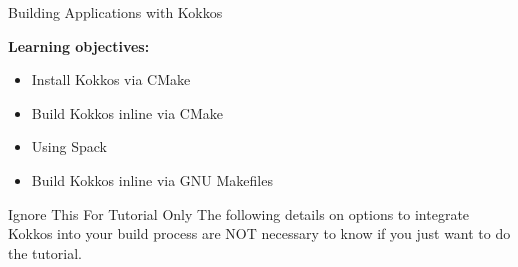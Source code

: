 



\begin{frame}[fragile]


  \vspace{10pt}
  {\Huge Building Applications with Kokkos}

  \vspace{10pt}

  \textbf{Learning objectives:}
  \begin{itemize}
    \item{Install Kokkos via CMake}
    \item{Build Kokkos inline via CMake}
    \item{Using Spack}
    \item{Build Kokkos inline via GNU Makefiles}
  \end{itemize}

  \pause

  \begin{block}{Ignore This For Tutorial Only}
     The following details on options to integrate Kokkos into your build process are NOT necessary to know if you just want to do the tutorial.
  \end{block}

\end{frame}

